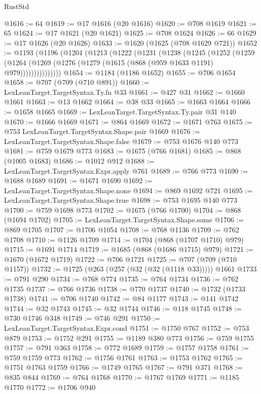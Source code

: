 \begin{lexlean}{RustStd}
\begin{coremodule}
@1616 := 64
@1619 := @17 @1616 (@20 @1616)
@1620 := @708 @1619
@1621 := 65
@1624 := @17 @1621 (@20 @1621)
@1625 := @708 @1624
@1626 := 66
@1629 := @17 @1626 (@20 @1626)
@1633 := @1620 (@1625 (@708 @1629 @721))
@1652 := @1193
    (@1196
      (@1204
        (@1213
          (@1222
            (@1231
              (@1238
                (@1245
                  (@1252
                    (@1259
                      (@1264
                        (@1269 (@1276 (@1279 (@1615 (@868 (@959 @1633 @1191) @979)))))))))))))))
@1654 := @1184 (@1186 @1652)
@1655 := @706 @1654
@1658 := @707 (@709 (@710 @891))
@1660 := LexLeanTarget.TargetSyntax.Ty.fn @33
@1661 := @427 @31
@1662 := @1660 @1661
@1663 := @13 @1662
@1664 := @38 @33
@1665 := @1663 @1664
@1666 := @1658 @1665
@1669 := LexLeanTarget.TargetSyntax.Ty.pair @31 @140
@1670 := @1666 @1669
@1671 := @864 @1669
@1672 := @1671 @763
@1675 := @753 LexLeanTarget.TargetSyntax.Shape.pair @1669
@1676 := LexLeanTarget.TargetSyntax.Shape.false
@1679 := @753 @1676 @140 @773
@1681 := @759 @1679 @773
@1683 := @1675 (@766 @1681)
@1685 := @868 (@1005 @1683)
@1686 := @1012 @912
@1688 := LexLeanTarget.TargetSyntax.Expr.apply @761
@1689 := @766 @773
@1690 := @1688 @1689
@1691 := @1671 @1690
@1692 := LexLeanTarget.TargetSyntax.Shape.none
@1694 := @869 @1692 @721
@1695 := LexLeanTarget.TargetSyntax.Shape.true
@1698 := @753 @1695 @140 @773
@1700 := @759 @1698 @773
@1702 := @1675 (@766 @1700)
@1704 := @868 (@1694 @1702)
@1705 := LexLeanTarget.TargetSyntax.Shape.some
@1706 := @869 @1705
@1707 := @1706 @1054
@1708 := @768 @1136
@1709 := @762 @1708
@1710 := @1126 @1709
@1714 := @1704 (@868 (@1707 @1710) @979)
@1715 := @1691 @1714
@1719 := @1685 (@868 (@1686 @1715) @979)
@1721 := @1670 (@1672 @1719)
@1722 := @706 @1721
@1725 := @707 (@709 (@710 @1157))
@1732 := @1725 (@263 (@257 (@32 (@32 (@1118 @33))))) @1661
@1733 := @791 @290
@1734 := @768 @774
@1735 := @764 @1734
@1736 := @762 @1735
@1737 := @766 @1736
@1738 := @770 @1737
@1740 := @1732 (@1733 @1738)
@1741 := @706 @1740
@1742 := @84 @1177
@1743 := @141 @1742
@1744 := @32 @1743
@1745 := @32 @1744
@1746 := @118 @1745
@1748 := @730 @1746 @348
@1749 := @746 @291
@1750 := LexLeanTarget.TargetSyntax.Expr.cond
@1751 := @1750 @767
@1752 := @753 @879
@1753 := @1752 @291
@1755 := @1189 @380 @773
@1756 := @759 @1755
@1757 := @791 @363
@1758 := @772 @1689
@1759 := @1757 @1758
@1761 := @759 @1759 @773
@1762 := @1756 @1761
@1763 := @1753 @1762
@1765 := @1751 @1763 @1759
@1766 := @1749 @1765
@1767 := @791 @371
@1768 := @835 @844
@1769 := @764 @1768
@1770 := @1767 @1769
@1771 := @1185 @1770
@1772 := @1706 @940

\end{coremodule}
\end{lexlean}
